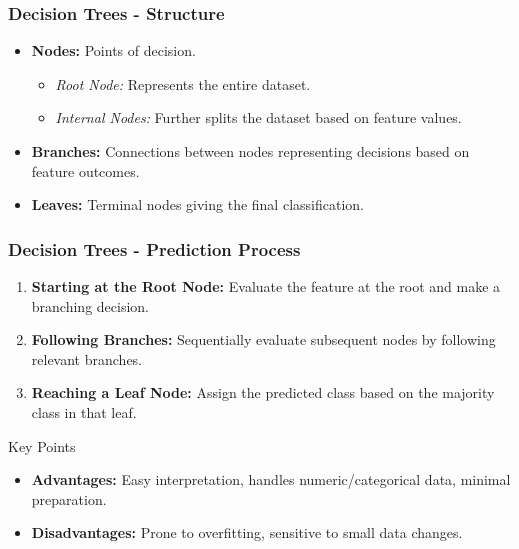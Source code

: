 \documentclass[aspectratio=169]{beamer}
\begin{document}
\begin{frame}[fragile]
    \frametitle{Decision Trees - Structure}
    \begin{itemize}
        \item \textbf{Nodes:} Points of decision.
            \begin{itemize}
                \item \textit{Root Node:} Represents the entire dataset.
                \item \textit{Internal Nodes:} Further splits the dataset based on feature values.
            \end{itemize}
        \item \textbf{Branches:} Connections between nodes representing decisions based on feature outcomes.
        \item \textbf{Leaves:} Terminal nodes giving the final classification.
    \end{itemize}
\end{frame}

\begin{frame}[fragile]
    \frametitle{Decision Trees - Prediction Process}
    \begin{enumerate}
        \item \textbf{Starting at the Root Node:} Evaluate the feature at the root and make a branching decision.
        \item \textbf{Following Branches:} Sequentially evaluate subsequent nodes by following relevant branches.
        \item \textbf{Reaching a Leaf Node:} Assign the predicted class based on the majority class in that leaf.
    \end{enumerate}
    \pause
    \begin{block}{Key Points}
        \begin{itemize}
            \item \textbf{Advantages:} Easy interpretation, handles numeric/categorical data, minimal preparation.
            \item \textbf{Disadvantages:} Prone to overfitting, sensitive to small data changes.
        \end{itemize}
    \end{block}
\end{frame}
\end{document}
